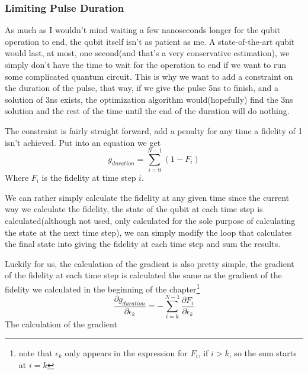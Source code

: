 \documentclass[english, a4paper, 12pt, twoside]{article}
\numberwithin{equation}{section} %
\begin{document}
\subsubsection{Limiting Pulse Duration}
As much as I wouldn't mind waiting a few nanoseconds longer for the qubit operation to end, the qubit itself isn't as patient as me. A state-of-the-art qubit would last, at most, one second(and that's a very conservative estimation), we simply don't have the time to wait for the operation to end if we want to run some complicated quantum circuit. This is why we want to add a constraint on the duration of the pulse, that way, if we give the pulse 5ns to finish, and a solution of 3ns exists, the optimization algorithm would(hopefully) find the 3ns solution and the rest of the time until the end of the duration will do nothing.

The constraint is fairly straight forward, add a penalty for any time a fidelity of 1 isn't achieved. Put into an equation we get
\[
    g_{duration} = \sum_{i = 0}^{N-1} (1 - F_i)
\]
Where $F_i$ is the fidelity at time step $i$.

We can rather simply calculate the fidelity at any given time since the current way we calculate the fidelity, the state of the qubit at each time step is calculated(although not used, only calculated for the sole purpose of calculating the state at the next time step), we can simply modify the loop that calculates the final state into giving the fidelity at each time step and sum the results. 

Luckily for us, the calculation of the gradient is also pretty simple, the gradient of the fidelity at each time step is calculated the same as the gradient of the fidelity we calculated in the beginning of the chapter\footnote{note that $\epsilon_k$ only appears in the expression for $F_i$, if $i > k$, so the sum starts at $i = k$}
\[
    \frac{\partial g_{duration}}{\partial \epsilon_k} = -\sum_{i = k}^{N-1}\frac{\partial F_i}{\partial \epsilon_k}
\]
The calculation of the gradient %
\end{document}
